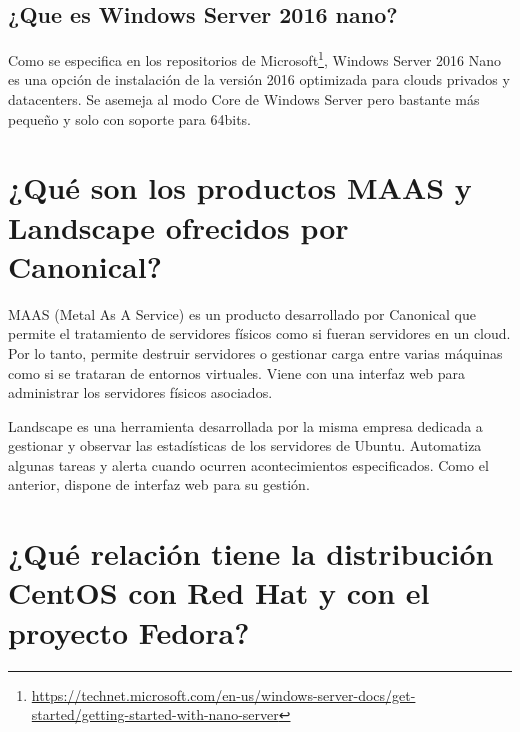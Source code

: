 \subsection{¿Que es Windows Server 2016 nano?}

Como se especifica en los repositorios de Microsoft\footnote{\url{https://technet.microsoft.com/en-us/windows-server-docs/get-started/getting-started-with-nano-server}}, 
Windows Server 2016 Nano es una opción de instalación de la versión 2016 optimizada para
clouds privados y datacenters. Se asemeja al modo Core de Windows Server pero bastante más pequeño y solo con soporte para 64bits.






\section{¿Qué son los productos MAAS y Landscape ofrecidos por Canonical?}

MAAS\cite{maas} (Metal As A Service) es un producto desarrollado por Canonical que permite el tratamiento de servidores físicos como 
si fueran servidores en un cloud. Por lo tanto, permite destruir servidores o gestionar carga entre varias máquinas como si 
se trataran de entornos virtuales. Viene con una interfaz web para administrar los servidores físicos asociados.

\vspace{8mm}

Landscape\cite{landscape} es una herramienta desarrollada por la misma empresa dedicada a gestionar y observar las estadísticas de los servidores de Ubuntu.
Automatiza algunas tareas y alerta cuando ocurren acontecimientos especificados. Como el anterior, dispone de interfaz web para su gestión.






\section{¿Qué relación tiene la distribución CentOS con Red Hat y con el proyecto Fedora?}

